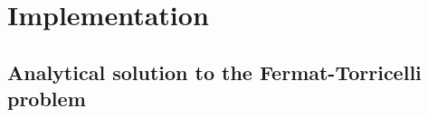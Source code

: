  {
\abnormalparskip{0pt}
\chapter{Implementation}
\label{cha:implementation}
}

\section{Analytical solution to the Fermat-Torricelli problem}
\label{sec:analyt-solut-ferm}



\chapterbreak{}

